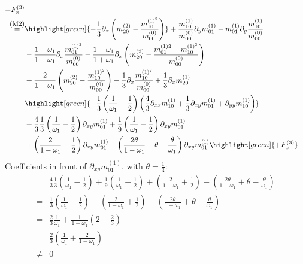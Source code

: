 \documentclass{article}
\begin{document}
\begin{align*}
{  + F_x^{(3)}
  }
  \\ \overset{\text{\small(M2)}}{=} &
  \highlight[green]{
  - \frac{1}{3} \partial_x \left(m_{20}^{(2)} - \frac{m_{10}^{{(1)}^2}}{m_{00}^{(0)}}\right)
  }
  + \frac{m_{10}^{(1)}}{m_{00}^{(0)}} \partial_y m_{01}^{(1)}
  - m_{01}^{(1)} \partial_y \frac{m_{10}^{(1)}}{m_{00}^{(0)}}
  \\&
  - \frac{1 - \omega_1}{1 + \omega_1} \partial_x \frac{m_{01}^{{(1)}^2}}{m_{00}^{(0)}}
  - \frac{1 - \omega_1}{1 + \omega_1} \partial_x \left(m_{20}^{(2)} - \frac{m_{01}^{(1)2} - m_{10}^{{(1)}^2}}{m_{00}^{(0)}}\right)
  \\&
  + \frac{2}{1-\omega_1} \left(m_{20}^{(2)} - \frac{m_{10}^{{(1)}^2}}{m_{00}^{(0)}}\right)
  - \frac{1}{3} \partial_x \frac{m_{10}^{{(1)}^2}}{m_{00}^{(0)}}
  + \frac{1}{3} \partial_x m_{20}^{(1)}
  \\&
  \highlight[green]{
  + \frac{1}{3}\left(\frac{1}{\omega_1}-\frac{1}{2}\right) \left(\frac{4}{3}\partial_{xx} m_{10}^{(1)} + \frac{1}{3} \partial_{xy}m_{01}^{(1)} + \partial_{yy}m_{10}^{(1)}\right)
  }
  \\&
  + \frac{4}{3}\frac{1}{3}\left(\frac{1}{\omega_1}-\frac{1}{2}\right) \partial_{xy}m_{01}^{(1)}
  + \frac{1}{9}\left(\frac{1}{\omega_1}-\frac{1}{2}\right) \partial_{xy}m_{01}^{(1)}
  \\&
  + \left(\frac{2}{1-\omega_1} + \frac{1}{2}\right) \partial_{xy}m_{01}^{(1)}
  - \left(\frac{2\theta}{1-\omega_1} +\theta- \frac{\theta}{\omega_1}\right) \partial_{xy}m_{01}^{(1)}
  \highlight[green]{
  + F_x^{(3)}
  }
\end{align*}
Coefficients in front of $\partial_{xy}m_{01}^{(1)}$, with $\theta=\frac{1}{3}$:
\begin{align*}
  & \frac{4}{3}\frac{1}{3}\left(\frac{1}{\omega_1}-\frac{1}{2}\right)
  + \frac{1}{9}\left(\frac{1}{\omega_1}-\frac{1}{2}\right)
  + \left(\frac{2}{1-\omega_1} + \frac{1}{2}\right)
  - \left(\frac{2\theta}{1-\omega_1} +\theta- \frac{\theta}{\omega_1}\right)
  \\=&
  \frac{1}{3}\left(\frac{1}{\omega_1}-\frac{1}{2}\right)
  + \left(\frac{2}{1-\omega_1} + \frac{1}{2}\right)
  - \left(\frac{2\theta}{1-\omega_1} +\theta- \frac{\theta}{\omega_1}\right)
  \\=&
  \frac{2}{3}\frac{1}{\omega_1}
  + \frac{1}{1-\omega_1} \left( 2 - \frac{2}{3}\right)
  \\=&
  \frac{2}{3}\left(\frac{1}{\omega_1} + \frac{2}{1-\omega_1} \right)
  \\\neq&0
\end{align*}
\end{document}
